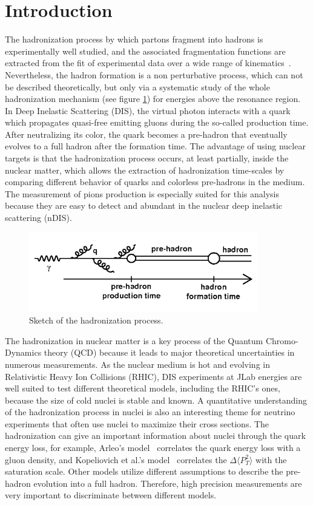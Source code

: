 
\section{Introduction}
\label{physics}

The hadronization process by which partons fragment into hadrons is 
experimentally well studied, and the associated fragmentation functions are extracted from the fit of experimental data over a wide range of kinematics~\cite{Albino:2008fy}. Nevertheless, the hadron formation is a non perturbative process, which can not be described theoretically, but only via a systematic study of the whole hadronization mechanism (see figure \ref{fig:hadro}) for energies above the resonance region. In Deep Inelastic Scattering (DIS), the virtual photon interacts with a quark which propagates quasi-free emitting gluons during the so-called production time. After neutralizing its color, the quark becomes a pre-hadron that eventually evolves to a full hadron after the formation time. The advantage of using nuclear targets is that the hadronization process occurs, at least partially, inside the nuclear matter, which allows the extraction of hadronization time-scales by comparing different behavior of quarks and colorless pre-hadrons in the medium. The measurement of pions production is especially suited for this analysis because they are easy to detect and abundant in the nuclear deep inelastic scattering (nDIS).

\begin{figure}[htbp]
\centering
\includegraphics[width=10cm] {fig/hadro.png} 
\caption {Sketch of the hadronization process.}
\label{fig:hadro}
\end{figure}

The hadronization in nuclear matter is a key process of the Quantum Chromo-Dynamics theory (QCD) because it leads to major theoretical uncertainties in numerous measurements. As the nuclear medium is hot and evolving in Relativistic Heavy Ion Collisions (RHIC), DIS experiments at JLab energies are well suited to test different theoretical models, including the RHIC's ones, because the size of cold nuclei is stable and known. A quantitative understanding of the hadronization process in nuclei is also an interesting theme for neutrino experiments that often use nuclei to maximize their cross sections. The hadronization can give an important information about nuclei through the quark energy loss, for example, Arleo's model~\cite{Arleo:2003yf} correlates the quark energy loss with a gluon density, and Kopeliovich et al.'s model~\cite{Kopeliovich:2010aa} correlates the $\Delta \langle P_T^2 \rangle$ with the saturation scale. Other models \cite{Gallmeister:2007an} utilize different assumptions to describe the pre-hadron evolution into a full hadron. Therefore, high precision measurements are very important to discriminate between different models. 

